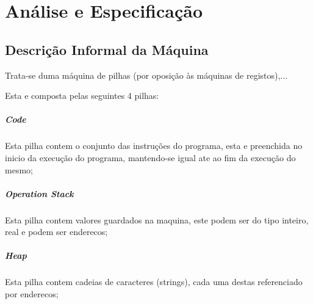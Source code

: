 \documentclass{report}
\begin{document}
\chapter{Análise e Especificação} \label{ae}
\section{Descrição Informal da Máquina}

\quad Trata-se duma máquina de pilhas (por oposição às máquinas de registos),...



Esta e composta pelas seguintes 4 pilhas:
\paragraph{\quad Code}
Esta pilha contem o conjunto das instruções do programa, esta e preenchida no inicio da execução do programa, mantendo-se igual
ate ao fim da execução do mesmo;
\paragraph{\quad Operation Stack}
Esta pilha contem valores guardados na maquina, este podem ser do tipo inteiro, real e podem ser enderecos;
\paragraph{\quad Heap}
Esta pilha contem cadeias de caracteres (strings), cada uma destas referenciado por enderecos;
\end{document}
